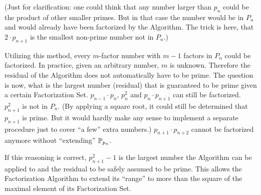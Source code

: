 \documentclass[a4paper,10pt]{article}
\begin{document}
(Just for clarification: one could think that any number larger than $p_n$ could
be the product of other smaller primes.
But in that case the number would be in $P_n$ and would already have been factorized
by the Algorithm.
The trick is here, that $2 \cdot p_{n+1}$ is the smallest non-prime number not in $P_n$.)

Utilizing this method, every $m$-factor number with $m-1$ factors in $P_n$ could
be factorized.
In practice, given an arbitrary number, $m$ is unknown.
Therefore the residual of the Algorithm does not automatically have to be prime.
The question is now, what is the largest number (residual) that is guaranteed to be prime
given a certain Factorization Set.
$p_{n-1} \cdot p_n$, $p_n^2$ and $p_n \cdot p_{n+1}$ can still be factorized.
$p_{n+1}^2$ is not in $P_n$.
(By applying a square root, it could still be determined that $p_{n+1}$ is prime.
But it would hardly make any sense to implement a separate procedure just to cover
``a few'' extra numbers.)
$p_{n+1} \cdot p_{n+2}$ cannot be factorized anymore without ``extending'' $\mathbb{P}_{p_n}$.

If this reasoning is correct, $p_{n+1}^2 - 1$ is the largest number
the Algorithm can be applied to and the residual to be safely assumed to be prime.
This allows the Factorization Algorithm to extend its ``range'' to more than the
square of the maximal element of its Factorization Set.
\end{document}
